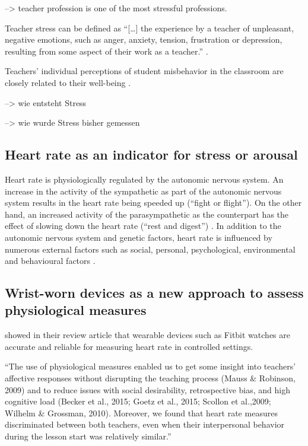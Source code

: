 \documentclass[]{elsarticle} %
\begin{document}
--\textgreater{} teacher profession is one of the most stressful
professions.

Teacher stress can be defined as ``{[}\ldots{]} the experience by a
teacher of unpleasant, negative emotions, such as anger, anxiety,
tension, frustration or depression, resulting from some aspect of their
work as a teacher.'' \citep{kyriacou2001teacher}.

Teachers' individual perceptions of student misbehavior in the classroom
are closely related to their well-being \citep{ALDRUP2018126}.

--\textgreater{} wie entsteht Stress

--\textgreater{} wie wurde Stress bisher gemessen

\hypertarget{heart-rate-as-an-indicator-for-stress-or-arousal}{%
\subsection{Heart rate as an indicator for stress or
arousal}\label{heart-rate-as-an-indicator-for-stress-or-arousal}}

Heart rate is physiologically regulated by the autonomic nervous system.
An increase in the activity of the sympathetic as part of the autonomic
nervous system results in the heart rate being speeded up (``fight or
flight''). On the other hand, an increased activity of the
parasympathetic as the counterpart has the effect of slowing down the
heart rate (``rest and digest'') \citep{Battipaglia2015}. In addition to
the autonomic nervous system and genetic factors, heart rate is
influenced by numerous external factors such as social, personal,
psychological, environmental and behavioural factors
\citep{wang2022using}.

\hypertarget{wrist-worn-devices-as-a-new-approach-to-assess-physiological-measures}{%
\subsection{Wrist-worn devices as a new approach to assess physiological
measures}\label{wrist-worn-devices-as-a-new-approach-to-assess-physiological-measures}}

\citet{fuller2020reliability} showed in their review article that
wearable devices such as Fitbit watches are accurate and reliable for
measuring heart rate in controlled settings.

``The use of physiological measures enabled us to get some insight into
teachers' affective responses without disrupting the teaching process
(Mauss \& Robinson, 2009) and to reduce issues with social desirability,
retrospective bias, and high cognitive load (Becker et al., 2015; Goetz
et al., 2015; Scollon et al.,2009; Wilhelm \& Grossman, 2010). Moreover,
we found that heart rate measures discriminated between both teachers,
even when their interpersonal behavior during the lesson start was
relatively similar.''
\end{document}
